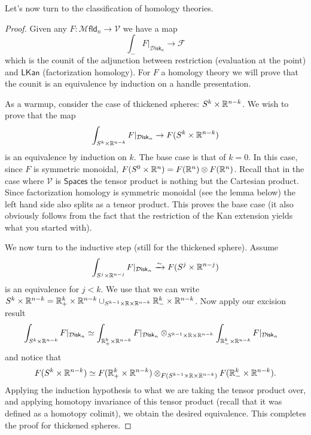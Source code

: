 \documentclass{amsart}
\begin{document}
Let's now turn to the classification of homology theories.
\begin{proof}
    Given any $F:\mathcal{M}\mathsf{fld}_n\to \mathcal{V}$ we have a map
    \begin{equation*}
        \int_- F|_{\mathcal{D}\mathsf{isk}_n} \to \mathcal{F}
    \end{equation*}
    which is the counit of the adjunction between restriction (evaluation at the point) and $\mathsf{LKan}$
    (factorization homology). For $F$ a homology theory we will prove that the counit is
    an equivalence by induction on a handle presentation.

    As a warmup, consider the case of thickened spheres: $S^k\times\mathbb{R}^{n-k}$. We wish to prove
    that the map
    \begin{equation*}
        \int_{S^k\times\mathbb{R}^{n-k}} F|_{\mathcal{D}\mathsf{isk}_n}\to F(S^k\times\mathbb{R}^{n-k})
    \end{equation*}
    is an equivalence by induction on $k$. The base case is that of $k=0$. In this case,
    since $F$ is symmetric monoidal, $F(S^0\times\mathbb{R}^n)=F(\mathbb{R}^n)\otimes F(\mathbb{R}^n)$. Recall
    that in the case where $\mathcal{V}$ is $\mathsf{Spaces}$ the tensor product is nothing
    but the Cartesian product. Since factorization homology is symmetric monoidal (see
    the lemma below) the left hand side also splits as a tensor product. This proves the base
    case (it also obviously follows from the fact that the restriction of the Kan extension
    yields what you started with).

    We now turn to the inductive step (still for the thickened sphere). Assume
    \begin{equation*}
        \int_{S^j\times\mathbb{R}^{n-j}} F|_{\mathcal{D}\mathsf{isk}_n}\xrightarrow{\sim} F(S^j\times\mathbb{R}^{n-j})
    \end{equation*}
    is an equivalence for $j<k$.
    We use that we can write $S^k\times \mathbb{R}^{n-k} = \mathbb{R}^{k}_+\times\mathbb{R}^{n-k}\cup_{S^{k-1}\times\mathbb{R}\times\mathbb{R}^{n-k}}\mathbb{R}^k_-\times\mathbb{R}^{n-k}$.
    Now apply our excision result
    \begin{align*}
        \int_{S^k\times\mathbb{R}^{n-k}}F|_{\mathcal{D}\mathsf{isk}_n} &\simeq \int_{\mathbb{R}^k_+\times\mathbb{R}^{n-k}}F|_{\mathcal{D}\mathsf{isk}_n}\otimes_{S^{k-1}\times\mathbb{R}\times\mathbb{R}^{n-k}} \int_{\mathbb{R}^k_-\times\mathbb{R}^{n-k}} F|_{\mathcal{D}\mathsf{isk}_n}
    \end{align*}
    and notice that
    \begin{equation*}
        F(S^k\times\mathbb{R}^{n-k}) \simeq F(\mathbb{R}^k_+\times\mathbb{R}^{n-k})\otimes_{F(S^{k-1}\times\mathbb{R}\times\mathbb{R}^{n-k})} F(\mathbb{R}^k_-\times \mathbb{R}^{n-k}).
    \end{equation*}
    Applying the induction hypothesis to what we are taking the tensor product over, and applying
    homotopy invariance of this tensor product (recall that it was defined as a homotopy colimit),
    we obtain the desired equivalence. This completes the proof for thickened spheres.


\end{proof}
\end{document}
